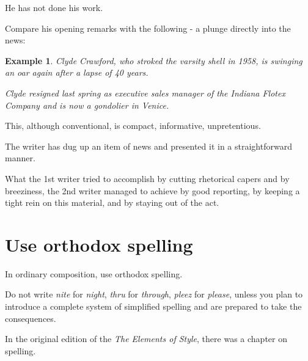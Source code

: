 \documentclass{book}
\numberwithin{equation}{section}
\newtheorem{example}{Example}[chapter]
\begin{document}
He has not done his work.

Compare his opening remarks with the following - a plunge directly into the news:
\begin{example}
    Clyde Crawford, who stroked the varsity shell in 1958, is swinging an oar again after a lapse of 40 years.
    
    Clyde resigned last spring as executive sales manager of the Indiana Flotex Company and is now a gondolier in Venice.
\end{example}
This, although conventional, is compact, informative, unpretentious.

The writer has dug up an item of news and presented it in a straightforward manner.

What the 1st writer tried to accomplish by cutting rhetorical capers and by breeziness, the 2nd writer managed to achieve by good reporting, by keeping a tight rein on this material, and by staying out of the act.

\section{Use orthodox spelling}
In ordinary composition, use orthodox spelling.

Do not write \textit{nite} for \textit{night}, \textit{thru} for \textit{through}, \textit{pleez} for \textit{please}, unless you plan to introduce a complete system of simplified spelling and are prepared to take the consequences.

%
In the original edition of the \textit{The Elements of Style}, there was a chapter on spelling.
\end{document}
